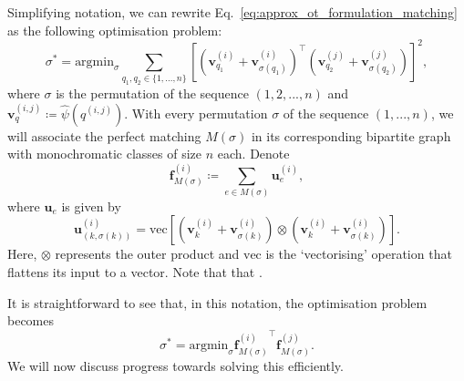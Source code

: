 Simplifying notation, we can rewrite Eq.~\ref{eq:approx_ot_formulation_matching} as the following optimisation problem:
\begin{equation}
\label{eq:quad}
\sigma^* = \textrm{argmin}_{\sigma} \sum_{q_1, q_2 \in \{1,...,n\}}[(\mathbf{v}_{q_1}^{(i)}+\mathbf{v}_{\sigma(q_1)}^{(i)})^{\top}(\mathbf{v}_{q_2}^{(j)}+\mathbf{v}_{\sigma(q_2)}^{(j)})]^{2},    
\end{equation}
where $\sigma$ is the permutation of the sequence $(1,2,...,n)$
and $\mathbf{v}_{q}^{(i,j)} \coloneqq \widehat{\psi}( q^{(i,j)})$. 
With every permutation $\sigma$ of the sequence $(1,...,n)$, we will associate the perfect matching $M(\sigma)$ in its corresponding bipartite graph with monochromatic classes of size $n$ each. 
Denote 
\begin{equation}
\mathbf{f}^{(i)}_{M(\sigma)} \coloneqq \sum_{e \in M(\sigma)} \mathbf{u}_{e}^{(i)},    
\end{equation}
where $\mathbf{u}_{e}$ is given by 
\begin{equation}
\mathbf{u}_{(k,\sigma(k))}^{(i)}= \textrm{vec} \left [(\mathbf{v}_{k}^{(i)}+\mathbf{v}^{(i)}_{\sigma(k)}) \otimes (\mathbf{v}_{k}^{(i)}+\mathbf{v}_{\sigma(k)}^{(i)}) \right].   
\end{equation}
Here, $\otimes$ represents the outer product and $\textrm{vec}$ is the `vectorising' operation that flattens its input to a vector.
Note that that .

It is straightforward to see that, in this notation, the optimisation problem becomes
\begin{equation} \label{eq:rewritten_problem}
    \sigma^* = \textrm{argmin}_{\sigma}  {\mathbf{f}^{(i)}_{M(\sigma)}}^\top \mathbf{f}^{(j)}_{M(\sigma)}.
\end{equation}
We will now discuss progress towards solving this efficiently.

